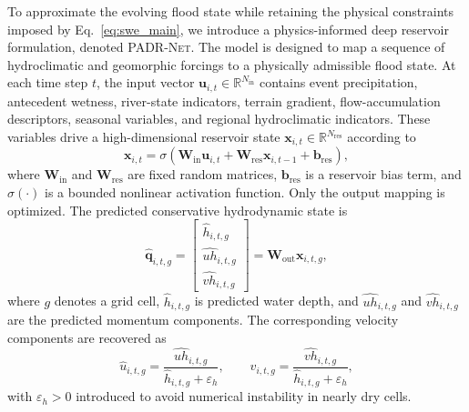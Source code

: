 \documentclass[pdflatex,sn-mathphys-ay]{sn-jnl}
\theoremstyle{thmstyleone}
\theoremstyle{thmstylethree}
\theoremstyle{thmstyletwo}
\begin{document}

To approximate the evolving flood state while retaining the physical
constraints imposed by Eq.~\eqref{eq:swe_main}, we introduce a
physics-informed deep reservoir formulation, denoted \textsc{PADR-Net}.
The model is designed to map a sequence of hydroclimatic and
geomorphic forcings to a physically admissible flood state.  At each
time step $t$, the input vector
$\mathbf{u}_{i,t}\in\mathbb{R}^{N_{\mathrm{in}}}$ contains event
precipitation, antecedent wetness, river-state indicators, terrain
gradient, flow-accumulation descriptors, seasonal variables, and
regional hydroclimatic indicators.  These variables drive a
high-dimensional reservoir state
$\mathbf{x}_{i,t}\in\mathbb{R}^{N_{\mathrm{res}}}$ according to
\begin{equation}
  \mathbf{x}_{i,t}
  =
  \sigma
  \left(
    \mathbf{W}_{\mathrm{in}}\mathbf{u}_{i,t}
    +
    \mathbf{W}_{\mathrm{res}}\mathbf{x}_{i,t-1}
    +
    \mathbf{b}_{\mathrm{res}}
  \right),
  \label{eq:padr_state}
\end{equation}
where $\mathbf{W}_{\mathrm{in}}$ and $\mathbf{W}_{\mathrm{res}}$ are
fixed random matrices, $\mathbf{b}_{\mathrm{res}}$ is a reservoir bias
term, and $\sigma(\cdot)$ is a bounded nonlinear activation function.
Only the output mapping is optimized.  The predicted conservative
hydrodynamic state is
\begin{equation}
  \hat{\mathbf{q}}_{i,t,g}
  =
  \begin{bmatrix}
    \hat{h}_{i,t,g} \\
    \widehat{uh}_{i,t,g} \\
    \widehat{vh}_{i,t,g}
  \end{bmatrix}
  =
  \mathbf{W}_{\mathrm{out}}
  \mathbf{x}_{i,t,g},
  \label{eq:padr_output}
\end{equation}
where $g$ denotes a grid cell, $\hat{h}_{i,t,g}$ is predicted water
depth, and $\widehat{uh}_{i,t,g}$ and $\widehat{vh}_{i,t,g}$ are the
predicted momentum components.  The corresponding velocity components
are recovered as
\begin{equation}
  \hat{u}_{i,t,g}
  =
  \frac{\widehat{uh}_{i,t,g}}
  {\hat{h}_{i,t,g}+\varepsilon_h},
  \qquad
  \hat{v}_{i,t,g}
  =
  \frac{\widehat{vh}_{i,t,g}}
  {\hat{h}_{i,t,g}+\varepsilon_h},
  \label{eq:padr_velocity}
\end{equation}
with $\varepsilon_h>0$ introduced to avoid numerical instability in
nearly dry cells.
\end{document}
